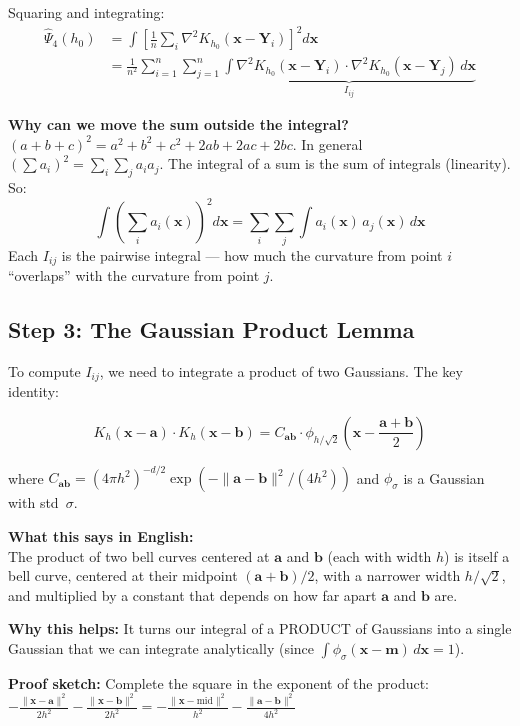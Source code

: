 \documentclass[12pt]{article}
\newcommand{\note}[1]{\begin{tcolorbox}[colback=yellow!5,colframe=yellow!60!black,breakable]\small #1\end{tcolorbox}}
\begin{document}
Squaring and integrating:
\begin{align*}
\hat\Psi_4(h_0) &= \int \left[\frac{1}{n}\sum_i \nabla^2 K_{h_0}(\mathbf{x}-\mathbf{Y}_i)\right]^2 d\mathbf{x} \\[6pt]
&= \frac{1}{n^2}\sum_{i=1}^n\sum_{j=1}^n \underbrace{\int \nabla^2 K_{h_0}(\mathbf{x}-\mathbf{Y}_i)\cdot\nabla^2 K_{h_0}(\mathbf{x}-\mathbf{Y}_j)\,d\mathbf{x}}_{I_{ij}}
\end{align*}

\note{
\textbf{Why can we move the sum outside the integral?}\\
$(a+b+c)^2 = a^2 + b^2 + c^2 + 2ab + 2ac + 2bc$. In general $(\sum a_i)^2 = \sum_i\sum_j a_i a_j$. The integral of a sum is the sum of integrals (linearity). So:
$$\int\left(\sum_i a_i(\mathbf{x})\right)^2 d\mathbf{x} = \sum_i\sum_j \int a_i(\mathbf{x})\,a_j(\mathbf{x})\,d\mathbf{x}$$
Each $I_{ij}$ is the pairwise integral --- how much the curvature from point $i$ ``overlaps'' with the curvature from point $j$.}

\subsection{Step 3: The Gaussian Product Lemma}

To compute $I_{ij}$, we need to integrate a product of two Gaussians. The key identity:

$$K_h(\mathbf{x}-\mathbf{a})\cdot K_h(\mathbf{x}-\mathbf{b}) = C_{\mathbf{ab}} \cdot \phi_{h/\sqrt{2}}\!\left(\mathbf{x} - \frac{\mathbf{a}+\mathbf{b}}{2}\right)$$

where $C_{\mathbf{ab}} = (4\pi h^2)^{-d/2}\exp(-\|\mathbf{a}-\mathbf{b}\|^2/(4h^2))$ and $\phi_\sigma$ is a Gaussian with std~$\sigma$.

\note{
\textbf{What this says in English:}\\
The product of two bell curves centered at $\mathbf{a}$ and $\mathbf{b}$ (each with width $h$) is itself a bell curve, centered at their midpoint $(\mathbf{a}+\mathbf{b})/2$, with a narrower width $h/\sqrt{2}$, and multiplied by a constant that depends on how far apart $\mathbf{a}$ and $\mathbf{b}$ are.

\textbf{Why this helps:} It turns our integral of a PRODUCT of Gaussians into a single Gaussian that we can integrate analytically (since $\int \phi_\sigma(\mathbf{x}-\mathbf{m})\,d\mathbf{x} = 1$).

\textbf{Proof sketch:} Complete the square in the exponent of the product:
$-\frac{\|\mathbf{x}-\mathbf{a}\|^2}{2h^2} - \frac{\|\mathbf{x}-\mathbf{b}\|^2}{2h^2} = -\frac{\|\mathbf{x}-\text{mid}\|^2}{h^2} - \frac{\|\mathbf{a}-\mathbf{b}\|^2}{4h^2}$
}
\end{document}
